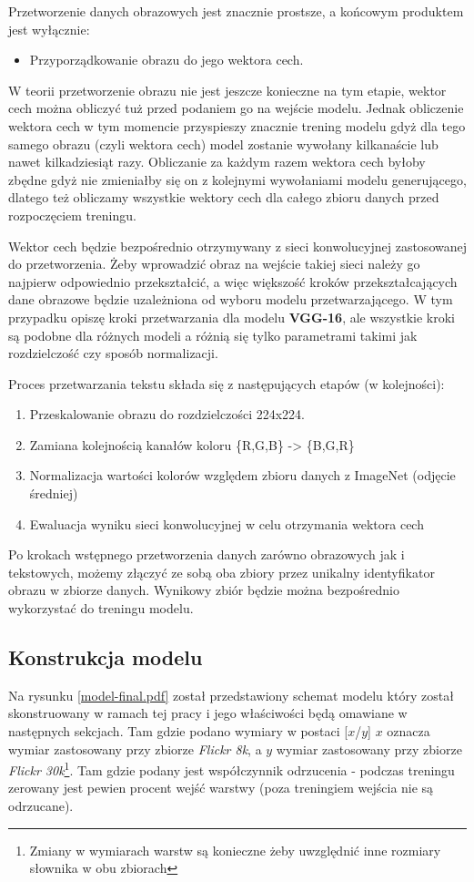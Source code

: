 
Przetworzenie danych obrazowych jest znacznie prostsze, a końcowym produktem jest wyłącznie:
\begin{itemize}
	\item Przyporządkowanie obrazu do jego wektora cech.
\end{itemize}
W teorii przetworzenie obrazu nie jest jeszcze konieczne na tym etapie, wektor cech można obliczyć tuż przed podaniem go na wejście modelu. Jednak obliczenie wektora cech w tym momencie przyspieszy znacznie trening modelu gdyż dla tego samego obrazu (czyli wektora cech) model zostanie wywołany kilkanaście lub nawet kilkadziesiąt razy. Obliczanie za każdym razem wektora cech byłoby zbędne gdyż nie zmieniałby się on z kolejnymi wywołaniami modelu generującego, dlatego też obliczamy wszystkie wektory cech dla całego zbioru danych przed rozpoczęciem treningu.

Wektor cech będzie bezpośrednio otrzymywany z sieci konwolucyjnej zastosowanej do przetworzenia. Żeby wprowadzić obraz na wejście takiej sieci należy go najpierw odpowiednio przekształcić, a więc większość kroków przekształcających dane obrazowe będzie uzależniona od wyboru modelu przetwarzającego. W tym przypadku opiszę kroki przetwarzania dla modelu \textbf{VGG-16}, ale wszystkie kroki są podobne dla różnych modeli a różnią się tylko parametrami takimi jak rozdzielczość czy sposób normalizacji.

Proces przetwarzania tekstu składa się z następujących etapów (w kolejności):
\begin{enumerate}
	\item Przeskalowanie obrazu do rozdzielczości 224x224.
	\item Zamiana kolejnością kanałów koloru \{R,G,B\} -> \{B,G,R\}
	\item Normalizacja wartości kolorów względem zbioru danych z ImageNet (odjęcie średniej)
	\item Ewaluacja wyniku sieci konwolucyjnej w celu otrzymania wektora cech
\end{enumerate}

Po krokach wstępnego przetworzenia danych zarówno obrazowych jak i tekstowych, możemy złączyć ze sobą oba zbiory przez unikalny identyfikator obrazu w zbiorze danych. Wynikowy zbiór będzie można bezpośrednio wykorzystać do treningu modelu.

\subsection{Konstrukcja modelu}
 Na rysunku \ref{model-final.pdf} został przedstawiony schemat modelu który został skonstruowany w ramach tej pracy i jego właściwości będą omawiane w następnych sekcjach. Tam gdzie podano wymiary w postaci [$x$/$y$] $x$ oznacza wymiar zastosowany przy zbiorze \textit{Flickr 8k}, a $y$ wymiar zastosowany przy zbiorze \textit{Flickr 30k}\footnote{Zmiany w wymiarach warstw są konieczne żeby uwzględnić inne rozmiary słownika w obu zbiorach}. Tam gdzie podany jest współczynnik odrzucenia - podczas treningu zerowany jest pewien procent wejść warstwy (poza treningiem wejścia nie są odrzucane).
